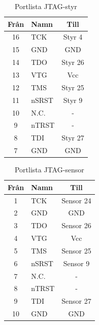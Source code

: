 \documentclass[10pt,oneside,swedish]{lips}
\begin{document}
\begin{longtable}{|c|p{17mm}|c|}
  \caption{Portlista JTAG-styr}
  \hline 
  Från & Namn &  Till\\
  \hline \hline
    16 & TCK &  Styr 4\\
    \hline
    15 & GND & GND\\
    \hline
    14 & TDO & Styr 26\\
    \hline
    13 & VTG & Vcc\\
    \hline
    12 & TMS &  Styr 25\\
    \hline
    11 & nSRST &  Styr 9\\
    \hline
    10 & N.C. & -\\
    \hline
    9 & nTRST & -\\
    \hline
    8 & TDI & Styr 27\\
    \hline
    7 & GND & GND\\
    \hline
\end{longtable}

\begin{longtable}{|c|p{17mm}|c|}
  \caption{Portlista JTAG-sensor}
  \hline 
  Från & Namn &  Till\\
  \hline \hline
    1 & TCK &  Sensor 24\\
    \hline
    2 & GND & GND\\
    \hline
    3 & TDO & Sensor 26\\
    \hline
    4 & VTG & Vcc\\
    \hline
    5 & TMS &  Sensor 25\\
    \hline
    6 & nSRST &  Sensor 9\\
    \hline
    7 & N.C. & -\\
    \hline
    8 & nTRST & -\\
    \hline
    9 & TDI & Sensor 27\\
    \hline
    10 & GND & GND\\
    \hline
\end{longtable}
\end{document}
